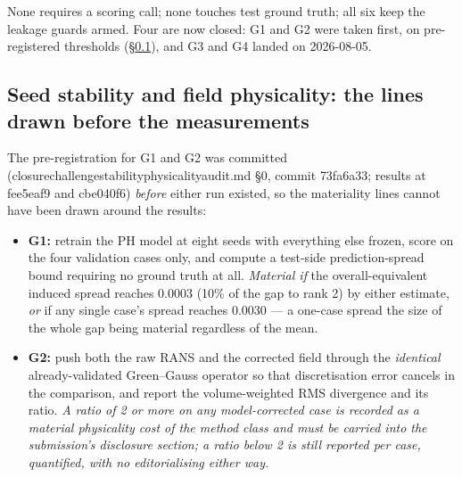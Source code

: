 \documentclass[11pt,a4paper]{article}
\newcommand{\breakus}{\textunderscore\allowbreak}
\newcommand{\code}[1]{{\small\ttfamily\let\_\breakus #1}}
\newcommand{\artifact}[1]{{\footnotesize\ttfamily\let\_\breakus #1}}
\begin{document}
None requires a scoring call; none touches test ground truth; all six keep the leakage
guards armed. Four are now closed: G1 and G2 were taken first, on pre-registered thresholds
(\S\ref{sec:stability}), and G3 and G4 landed on 2026-08-05.

\subsection{Seed stability and field physicality: the lines drawn before the measurements}
\label{sec:stability}

The pre-registration for G1 and G2 was committed
(\artifact{closure\_challenge\_stability\_physicality\_audit.md} \S0,
commit \code{73fa6a33}; results at \code{fee5eaf9} and \code{cbe040f6}) \emph{before} either
run existed, so the materiality lines cannot have been drawn around the results:

\begin{itemize}
\item \textbf{G1:} retrain the PH model at eight seeds with everything else frozen, score on
  the four validation cases only, and compute a test-side prediction-spread bound requiring
  no ground truth at all. \emph{Material if} the overall-equivalent induced spread reaches
  0.0003 (10\% of the gap to rank 2) by either estimate, \emph{or} if any single case's
  spread reaches 0.0030 --- a one-case spread the size of the whole gap being material
  regardless of the mean.
\item \textbf{G2:} push both the raw RANS and the corrected field through the
  \emph{identical} already-validated Green--Gauss operator so that discretisation error
  cancels in the comparison, and report the volume-weighted RMS divergence and its ratio.
  \emph{A ratio of 2 or more on any model-corrected case is recorded as a material
  physicality cost of the method class and must be carried into the submission's disclosure
  section; a ratio below 2 is still reported per case, quantified, with no editorialising
  either way.}
\end{itemize}
\end{document}
